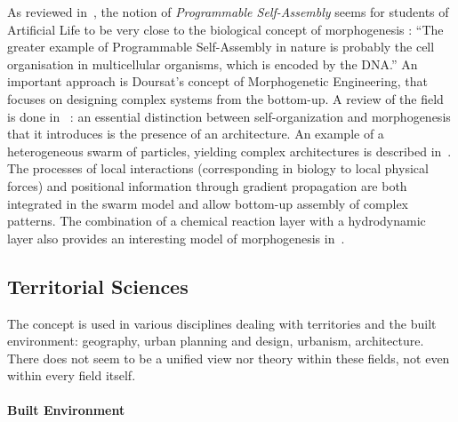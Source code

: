 \documentclass[fleqn,10pt]{wlscirep}
\begin{document}
As reviewed in~\cite{crosato2014self}, the notion of \emph{Programmable Self-Assembly} seems for students of Artificial Life to be very close to the biological concept of morphogenesis : ``The greater example of Programmable Self-Assembly in nature is probably the cell organisation in multicellular organisms, which is encoded by the DNA.'' An important approach is Doursat's concept of Morphogenetic Engineering, that focuses on designing complex systems from the bottom-up. A review of the field is done in~\cite{doursat2013review} : an essential distinction between self-organization and morphogenesis that it introduces is the presence of an architecture. An example of a heterogeneous swarm of particles, yielding complex architectures is described in~\cite{doursat2008programmable}. The processes of local interactions (corresponding in biology to local physical forces) and positional information through gradient propagation are both integrated in the swarm model and allow  bottom-up assembly of complex patterns. The combination of a chemical reaction layer with a hydrodynamic layer also provides an interesting model of morphogenesis in~\cite{cussat2012synthesis}.




\subsection*{Territorial Sciences}

The concept is used in various disciplines dealing with territories and the built environment: geography, urban planning and design, urbanism, architecture. There does not seem to be a unified view nor theory within these fields, not even within every field itself.

\paragraph{Built Environment}
\end{document}
